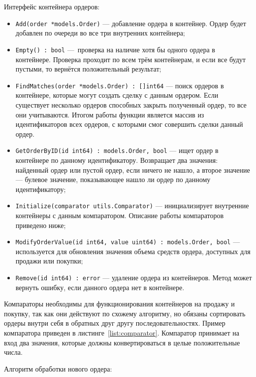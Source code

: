 Интерфейс контейнера ордеров:

\begin{itemize}
    \item \lstinline{Add(order *models.Order)} — добавление ордера в контейнер. Ордер будет добавлен по очереди во все три внутренних контейнера;
    \item \lstinline{Empty() : bool} — проверка на наличие хотя бы одного ордера в контейнере. Проверка проходит по всем трём контейнерам, и если все будут пустыми, то вернётся положительный результат;
    \item \lstinline{FindMatches(order *models.Order) : []int64} — поиск ордеров в контейнере, которые могут создать сделку с данным ордером. Если существует несколько ордеров способных закрыть полученный ордер, то все они учитываются. Итогом работы функции является массив из идентификаторов всех ордеров, с которыми смог совершить сделки данный ордер.
    \item \lstinline{GetOrderByID(id int64) : models.Order, bool} — ищет ордер в контейнере по данному идентификатору. Возвращает два значения: найденный ордер или пустой ордер, если ничего не нашло, а второе значение — булевое значение, показывающее нашло ли ордер по данному идентификатору;
    \item \lstinline{Initialize(comparator utils.Comparator)} — инициализирует внутренние контейнеры с данным компаратором. Описание работы компараторов приведено ниже;
    \item \lstinline{ModifyOrderValue(id int64, value uint64) : models.Order, bool} — используется для обновления значения объема средств ордера, доступных для продажи или покупки;
    \item \lstinline{Remove(id int64) : error} — удаление ордера из контейнеров. Метод может вернуть ошибку, если данного ордера нет в контейнере.
\end{itemize}

Компараторы необходимы для функционирования контейнеров на продажу и покупку, так как они действуют по схожему алгоритму, но обязаны сортировать ордеры внутри себя в обратных друг другу последовательностях. Пример компаратора приведен в листинге~\ref{list:comparator}. Компаратор принимает на вход два значения, которые должны конвертироваться в целые положительные числа.



Алгоритм обработки нового ордера:

